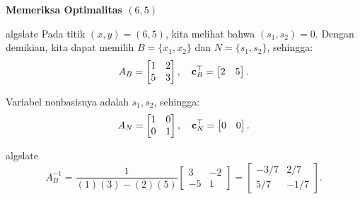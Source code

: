\begin{solution} \textbf{Memeriksa Optimalitas \( (6,5) \)}

\begin{steppanel}{algslate}
Pada titik $(x,y) = (6,5)$, kita melihat bahwa $(s_1, s_2) = 0$.  Dengan demikian, kita dapat memilih 
 \(B= \{x_1, x_2\} \) dan $N = \{s_1, s_2\}$, sehingga:
\[
A_B =
\begin{bmatrix}
    1 & 2 \\
    5 & 3
\end{bmatrix}, \quad
\mathbf{c}_B^\top =
\begin{bmatrix}
    2 & 5
\end{bmatrix}.
\]

Variabel nonbasisnya adalah \( s_1, s_2 \), sehingga:
\[
A_N =
\begin{bmatrix}
    1 & 0 \\
    0 & 1
\end{bmatrix}, \quad
\mathbf{c}_N^\top =
\begin{bmatrix}
    0 & 0
\end{bmatrix}.
\]

\end{steppanel}
\begin{steppanel}{algslate}
\[
A_B^{-1} =
\frac{1}{(1)(3) - (2)(5)}
\begin{bmatrix}
    3 & -2 \\
    -5 & 1
\end{bmatrix}
=
\begin{bmatrix}
    -3/7 & 2/7 \\
    5/7 & -1/7
\end{bmatrix}.
\]


\end{steppanel}
\end{solution}
